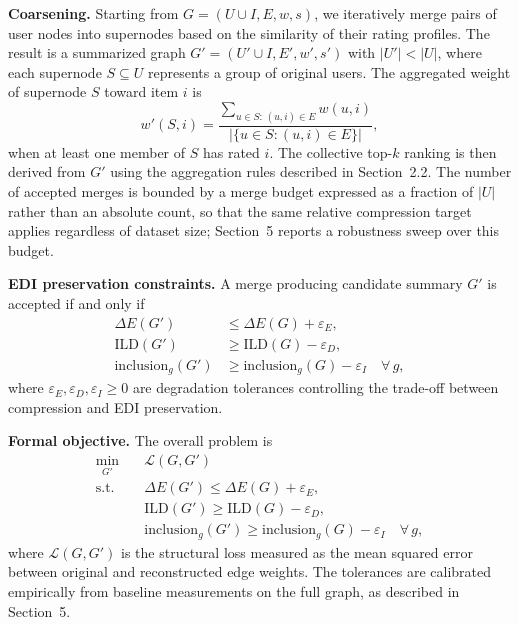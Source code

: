 \documentclass[runningheads]{llncs}
\begin{document}
\smallskip\noindent\textbf{Coarsening.}
Starting from $G = (U \cup I, E, w, s)$, we iteratively merge pairs of user
nodes into supernodes based on the similarity of their rating profiles. The
result is a summarized graph $G' = (U' \cup I, E', w', s')$ with $|U'| < |U|$,
where each supernode $S \subseteq U$ represents a group of original users.
The aggregated weight of supernode $S$ toward item $i$ is
\begin{equation}
  w'(S, i) =
    \frac{\displaystyle\sum_{u \in S:\,(u,i)\in E} w(u,i)}
         {|\{u \in S : (u,i) \in E\}|},
\end{equation}
when at least one member of $S$ has rated $i$. The collective top-$k$ ranking
is then derived from $G'$ using the aggregation rules described in Section~2.2.
The number of accepted merges is bounded by a merge budget expressed as a
fraction of $|U|$ rather than an absolute count, so that the same relative
compression target applies regardless of dataset size; Section~5 reports a
robustness sweep over this budget.

\smallskip\noindent\textbf{EDI preservation constraints.}
A merge producing candidate summary $G'$ is accepted if and only if
\begin{align}
  \Delta E(G') &\leq \Delta E(G) + \varepsilon_E, \\
  \mathrm{ILD}(G') &\geq \mathrm{ILD}(G) - \varepsilon_D, \\
  \mathrm{inclusion}_g(G') &\geq \mathrm{inclusion}_g(G) - \varepsilon_I
  \quad \forall\, g,
\end{align}
where $\varepsilon_E, \varepsilon_D, \varepsilon_I \geq 0$ are degradation
tolerances controlling the trade-off between compression and EDI preservation.

\smallskip\noindent\textbf{Formal objective.}
The overall problem is
\begin{equation}
\begin{aligned}
  \min_{G'} \quad & \mathcal{L}(G, G') \\
  \text{s.t.} \quad
    & \Delta E(G') \leq \Delta E(G) + \varepsilon_E, \\
    & \mathrm{ILD}(G') \geq \mathrm{ILD}(G) - \varepsilon_D, \\
    & \mathrm{inclusion}_g(G') \geq \mathrm{inclusion}_g(G) - \varepsilon_I
      \quad \forall\, g,
\end{aligned}
\end{equation}
where $\mathcal{L}(G, G')$ is the structural loss measured as the mean squared
error between original and reconstructed edge weights. The tolerances are
calibrated empirically from baseline measurements on the full graph, as
described in Section~5.
\end{document}
